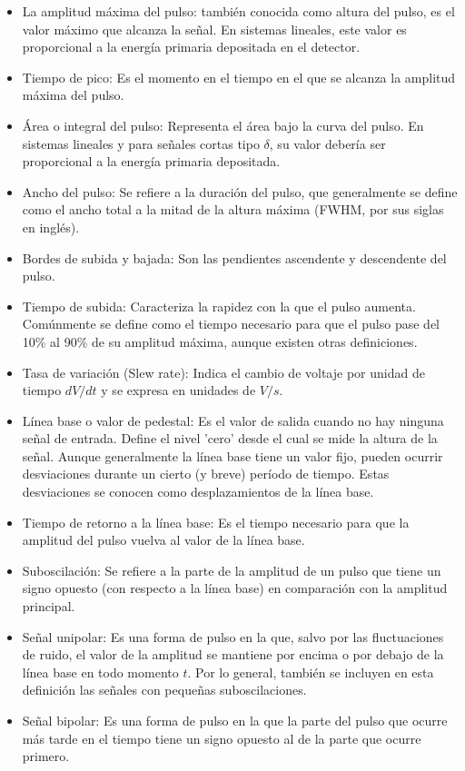 \documentclass[]{book}
\begin{document}
\begin{itemize}
    \item La amplitud máxima del pulso: también conocida como altura del pulso, es el valor máximo que alcanza la señal. En sistemas lineales, este valor es proporcional a la energía primaria depositada en el detector.
    \item Tiempo de pico: Es el momento en el tiempo en el que se alcanza la amplitud máxima del pulso.
    \item Área o integral del pulso: Representa el área bajo la curva del pulso. En sistemas lineales y para señales cortas tipo $\delta$, su valor debería ser proporcional a la energía primaria depositada.
    \item Ancho del pulso: Se refiere a la duración del pulso, que generalmente se define como el ancho total a la mitad de la altura máxima (FWHM, por sus siglas en inglés).
    \item Bordes de subida y bajada: Son las pendientes ascendente y descendente del pulso.
    \item Tiempo de subida: Caracteriza la rapidez con la que el pulso aumenta. Comúnmente se define como el tiempo necesario para que el pulso pase del 10\% al 90\% de su amplitud máxima, aunque existen otras definiciones.
    \item Tasa de variación (Slew rate): Indica el cambio de voltaje por unidad de tiempo $dV/dt$ y se expresa en unidades de $V/s$.
    \item Línea base o valor de pedestal: Es el valor de salida cuando no hay ninguna señal de entrada. Define el nivel 'cero' desde el cual se mide la altura de la señal. Aunque generalmente la línea base tiene un valor fijo, pueden ocurrir desviaciones durante un cierto (y breve) período de tiempo. Estas desviaciones se conocen como desplazamientos de la línea base.
    \item Tiempo de retorno a la línea base: Es el tiempo necesario para que la amplitud del pulso vuelva al valor de la línea base.
    \item Suboscilación: Se refiere a la parte de la amplitud de un pulso que tiene un signo opuesto (con respecto a la línea base) en comparación con la amplitud principal.
    \item Señal unipolar: Es una forma de pulso en la que, salvo por las fluctuaciones de ruido, el valor de la amplitud se mantiene por encima o por debajo de la línea base en todo momento $t$. Por lo general, también se incluyen en esta definición las señales con pequeñas suboscilaciones.
    \item Señal bipolar: Es una forma de pulso en la que la parte del pulso que ocurre más tarde en el tiempo tiene un signo opuesto al de la parte que ocurre primero.
\end{itemize}
\end{document}
